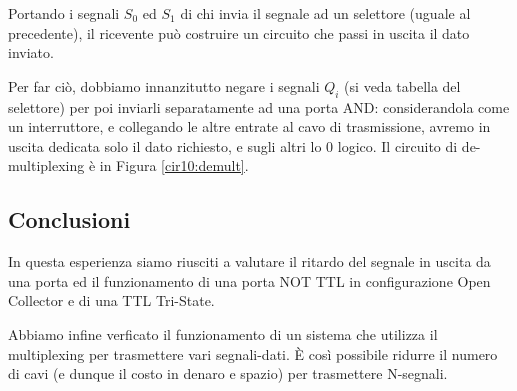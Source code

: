 Portando i segnali $S_0$ ed $S_1$ di chi invia il segnale ad un selettore (uguale al precedente), il ricevente può costruire un circuito che passi in uscita il dato inviato.

Per far ciò, dobbiamo innanzitutto negare i segnali $Q_i$ (si veda tabella del selettore) per poi inviarli separatamente ad una porta AND: considerandola come un interruttore, e collegando le altre entrate al cavo di trasmissione, avremo in uscita dedicata solo il dato richiesto, e sugli altri lo 0 logico.
Il circuito di de-multiplexing è in Figura \ref{cir10:demult}.


\subsection*{Conclusioni}

In questa esperienza siamo riusciti a valutare il ritardo del segnale in uscita da una porta ed il funzionamento di una porta NOT TTL in configurazione Open Collector e di una TTL Tri-State.

Abbiamo infine verficato il funzionamento di un sistema che utilizza il multiplexing per trasmettere vari segnali-dati. È così possibile ridurre il numero di cavi (e dunque il costo in denaro e spazio) per trasmettere N-segnali.

